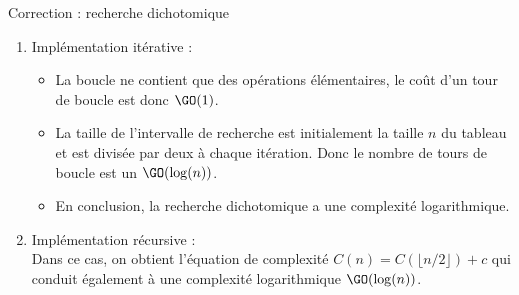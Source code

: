 \documentclass[10pt]{beamer}
\begin{document}
\begin{frame}[fragile]{\Ctitle}{\stitle}
	\begin{exampleblock}{Correction : recherche dichotomique}
		\begin{enumerate}
			\item Implémentation itérative :
			      \begin{itemize}
				      \item<2->\textcolor{OliveGreen}{La boucle ne contient que des opérations élémentaires, le coût d'un tour de boucle est donc $\GO(1)$.}
				      \item<3->\textcolor{OliveGreen}{La taille de l'intervalle de recherche est initialement la taille $n$ du tableau et est divisée par deux à chaque itération. Donc le nombre de tours de boucle est un $\GO(\log(n))$.}
				      \item<4->\textcolor{OliveGreen}{En conclusion, la recherche dichotomique a une complexité logarithmique.}
			      \end{itemize}
			\item<5-> Implémentation récursive :\\
				\textcolor{OliveGreen}{Dans ce cas, on obtient l'équation de complexité $C(n) = C(\lfloor n/2 \rfloor) + c$ qui conduit également à une complexité logarithmique $\GO(\log(n))$.}
		\end{enumerate}
	\end{exampleblock}
\end{frame}
\end{document}
